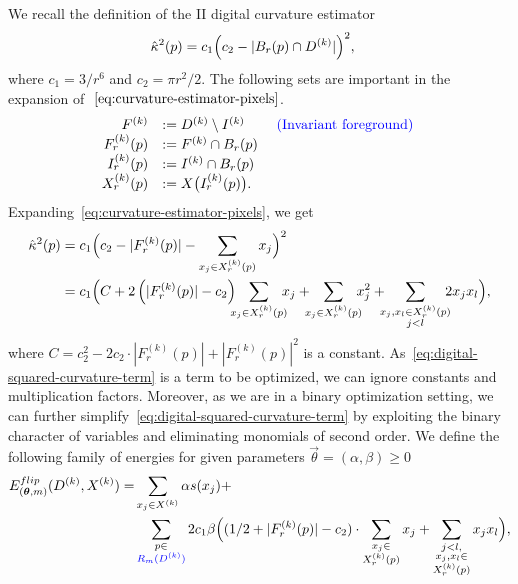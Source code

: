 We recall the definition of the II digital curvature estimator 
\begin{align}
	\hat{\kappa}^2(p) &= c_1\Big( c_2 - | B_r(p) \cap D^{(k)} | \Big)^2, 
	\label{eq:curvature-estimator-pixels}
\end{align}
where $c_1=3/r^6$ and $c_2=\pi r^2/2$. 
%
The following sets are important in the expansion of $~\cref{eq:curvature-estimator-pixels}$.
\begin{align*}
	\begin{array}{rll}
	F^{(k)} &:= D^{(k)} \setminus I^{(k)} & \text{ {\color{blue}{(Invariant foreground) }}} \\
	F_r^{(k)}(p) &:= F^{(k)} \cap B_r(p) &\\
	I_r^{(k)}(p) &:= I^{(k)} \cap B_r(p) & \\
	X_r^{(k)}(p) &:= X\big( I_r^{(k)}(p) \big). & \\	
	\end{array}
\end{align*}
%
%
Expanding~\cref{eq:curvature-estimator-pixels}, we get 
\begin{align}
  \hat{\kappa}^2(p) &= c_1\Big( c_2 - |F_{r}^{(k)}(p)| - \sum_{x_j \in X_r^{(k)}(p)} {x_j} \Big)^2 \nonumber \\
   &= c_1 \Big( C + 2\left( |F_{r}^{(k)}(p)| - c_2 \right) \hspace{-2mm}\sum_{x_j \in X_{r}^{(k)}(p)}\hspace{-2mm}{x_j} + \hspace{-2mm}\sum_{x_j \in X_{r}^{(k)}(p)}\hspace{-2mm}{x_j^2} + \hspace{-2mm}\sum_{ \substack{x_j,x_l \in X_{r}^{(k)}(p) \\ j<l} }\hspace{-2mm}{2x_jx_l}  \Big),
   \label{eq:digital-squared-curvature-term}
\end{align}
where $C=c_2^2 - 2c_2 \cdot |F_{r}^{(k)}(p)| + |F_{r}^{(k)}(p)|^2$ is a constant. As~\cref{eq:digital-squared-curvature-term} is a term to be optimized, we can ignore constants and multiplication factors. Moreover, as we are in a binary optimization setting, we can  further simplify~\cref{eq:digital-squared-curvature-term} by exploiting the binary character of variables and eliminating monomials of second order. We define the following family
of energies for given parameters $\vec{\theta}=(\alpha,\beta ) \geq 0$ 
\begin{align}
  E_{(\bm{\theta},m)}^{flip}(D^{(k)},X^{(k)}) =& \sum_{x_j \in X^{(k)}}{\alpha s(x_j)} + \nonumber \\ 
  & \sum_{ \substack{p \in \\ {\color{blue}{R_m(D^{(k)})}}}}{ 2c_1 \beta  \Big( { (1/2+ |F_{r}^{(k)}(p)|-c_2) \cdot \sum_{ \substack{ x_j \in \\ X_{r}^{(k)}(p)}}{x_j} } + \sum_{ \substack{j<l, \\ x_j,x_l \in \\ X_{r}^{(k)}(p) } }{x_jx_l} \Big) },
  \label{eq:energy-family}
\end{align}
